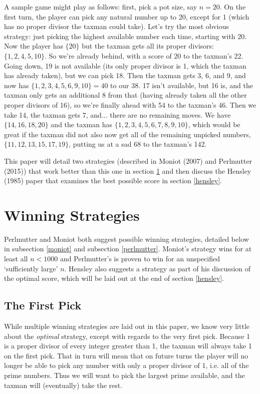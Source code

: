 \documentclass[a4paper,10pt]{amsart} %
\begin{document}
A sample game might play as follows: first, pick a pot size, say $n = 20$. On the first turn, the player can pick any natural number up to 20, except for 1 (which has no proper divisor the taxman could take). Let's try the most obvious strategy: just picking the highest available number each time, starting with 20. Now the player has $\{20\}$ but the taxman gets all its proper divisors: $\{1, 2, 4, 5, 10 \}$. So we're already behind, with a score of 20 to the taxman's 22. Going down, 19 is not available (its only proper divisor is 1, which the taxman has already taken), but we can pick 18. Then the taxman gets 3, 6, and 9, and now has $\{1,2,3,4,5,6,9,10 \} = 40$ to our $38$. 17 isn't available, but 16 is, and the taxman only gets an additional 8 from that (having already taken all the other proper divisors of 16), so we're finally ahead with 54 to the taxman's 46. Then we take 14, the taxman gets 7, and... there are no remaining moves. We have $\{14, 16, 18, 20\}$ and the taxman has $\{1,2,3,4,5,6,7,8,9,10 \}$, which would be great if the taxman did not also now get all of the remaining unpicked numbers, $\{11,12,13,15,17,19 \}$, putting us at a sad 68 to the taxman's 142. 

This paper will detail two strategies (described in Moniot (2007) and Perlmutter (2015)) that work better than this one in section \ref{strategies} and then discuss the Hensley (1985) paper that examines the best possible score in section \ref{hensley}. 

\section{Winning Strategies} \label{strategies}

Perlmutter and Moniot both suggest possible winning strategies, detailed below in subsection \ref{moniot} and subsection \ref{perlmutter}. Moniot's strategy wins for at least all $n < 1000$ and Perlmutter's is proven to win for an unspecified `sufficiently large' $n$. Hensley also suggests a strategy as part of his discussion of the optimal score, which will be laid out at the end of section \ref{hensley}.

\subsection{The First Pick} \label{firstpick}
While multiple winning strategies are laid out in this paper, we know very little about the \textit{optimal} strategy, except with regards to the very first pick. Because 1 is a proper divisor of every integer greater than 1, the taxman will always take 1 on the first pick. That in turn will mean that on future turns the player will no longer be able to pick any number with only a proper divisor of 1, i.e. all of the prime numbers. Thus we will want to pick the largest prime available, and the taxman will (eventually) take the rest. 
\end{document}
